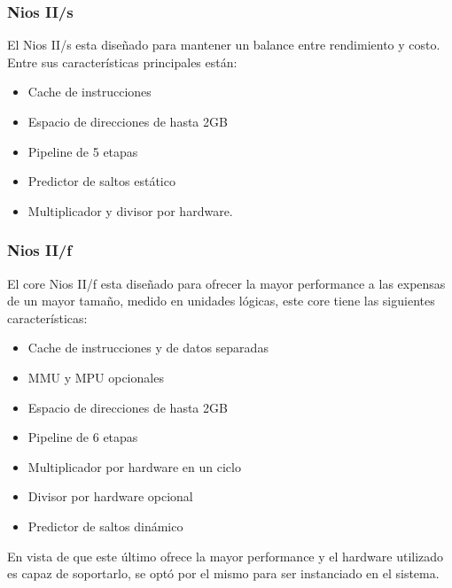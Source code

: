 \subsubsection{Nios II/s}
El Nios II/s esta diseñado para mantener un balance entre rendimiento y costo. Entre sus características principales están:

\begin{itemize}
	\item Cache de instrucciones
	\item Espacio de direcciones de hasta 2GB
	\item Pipeline de 5 etapas
	\item Predictor de saltos estático
	\item Multiplicador y divisor por hardware. 
\end{itemize}

\subsubsection{Nios II/f}
El core Nios II/f esta diseñado para ofrecer la mayor performance a las expensas de un mayor tamaño, medido en unidades lógicas, este core tiene las siguientes características:

\begin{itemize}
	\item Cache de instrucciones y de datos separadas
	\item MMU y MPU opcionales
	\item Espacio de direcciones de hasta 2GB
	\item Pipeline de 6 etapas
	\item Multiplicador por hardware en un ciclo
	\item Divisor por hardware opcional
	\item Predictor de saltos dinámico
\end{itemize}

En vista de que este último ofrece la mayor performance y el hardware utilizado es capaz de soportarlo, se optó por el mismo para ser instanciado en el sistema.

